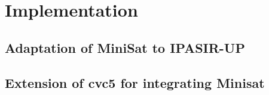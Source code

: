 \chapter{Implementation}

\section{Adaptation of MiniSat to IPASIR-UP}

\section{Extension of cvc5 for integrating Minisat}
